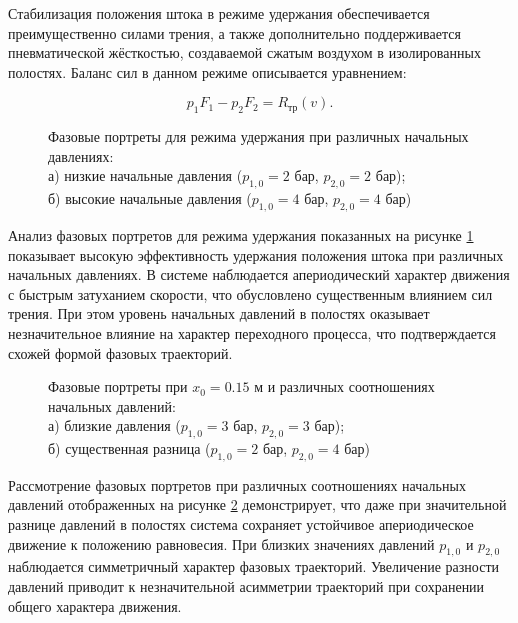 Стабилизация положения штока в режиме удержания обеспечивается преимущественно силами трения, а также дополнительно
поддерживается пневматической жёсткостью, создаваемой сжатым воздухом в изолированных полостях. Баланс сил в данном режиме описывается уравнением:

\begin{equation}
	p_1F_1 - p_2F_2 = R_\text{тр}(v).
\end{equation}

\begin{figure}[htbp]
	\caption{Фазовые портреты для режима удержания при различных начальных давлениях:\\
		а) низкие начальные давления ($p_{1,0} = 2$ бар, $p_{2,0} = \num{2}$ бар);\\
		б) высокие начальные давления ($p_{1,0} = 4$ бар, $p_{2,0} = \num{4}$ бар)}
	\label{fig:pp_hold_mode}
\end{figure}

Анализ фазовых портретов для режима удержания показанных на рисунке \ref{fig:pp_hold_mode} показывает высокую эффективность удержания положения штока при различных начальных давлениях.
В системе наблюдается апериодический характер движения с быстрым затуханием скорости, что обусловлено существенным влиянием сил трения.
При этом уровень начальных давлений в полостях оказывает незначительное влияние на характер переходного процесса, что подтверждается схожей формой фазовых траекторий.

\begin{figure}[htbp]
	\caption{Фазовые портреты при $x_0 = \num{0.15}$ м и различных соотношениях начальных давлений:\\
		а) близкие давления ($p_{1,0} = 3$ бар, $p_{2,0} = 3$ бар);\\
		б) существенная разница ($p_{1,0} = 2$ бар, $p_{2,0} = 4$ бар)}
	\label{fig:pp_hold_matrix}
\end{figure}

Рассмотрение фазовых портретов при различных соотношениях начальных давлений отображенных на  рисунке \ref{fig:pp_hold_matrix} демонстрирует,
что даже при значительной разнице давлений в полостях система сохраняет устойчивое апериодическое движение к положению равновесия.
При близких значениях давлений $p_{1,0}$ и $p_{2,0}$ наблюдается симметричный характер фазовых траекторий. Увеличение разности давлений приводит к незначительной асимметрии траекторий при сохранении общего характера движения.

